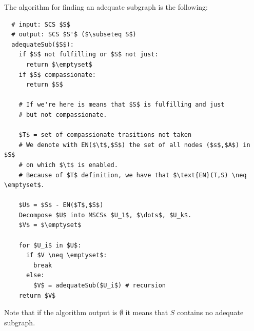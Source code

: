 \documentclass[oneside]{academica}
\begin{document}
The algorithm for finding an adequate subgraph is the following:
\begin{lstlisting}
  # input: SCS $S$
  # output: SCS $S'$ ($\subseteq S$)
  adequateSub($S$):
    if $S$ not fulfilling or $S$ not just:
      return $\emptyset$
    if $S$ compassionate:
      return $S$

    # If we're here is means that $S$ is fulfilling and just
    # but not compassionate.

    $T$ = set of compassionate trasitions not taken
    # We denote with EN($\t$,$S$) the set of all nodes ($s$,$A$) in $S$
    # on which $\t$ is enabled.
    # Because of $T$ definition, we have that $\text{EN}(T,S) \neq \emptyset$.

    $U$ = $S$ - EN($T$,$S$)
    Decompose $U$ into MSCSs $U_1$, $\dots$, $U_k$. 
    $V$ = $\emptyset$

    for $U_i$ in $U$:
      if $V \neq \emptyset$:
        break
      else:
        $V$ = adequateSub($U_i$) # recursion
    return $V$
\end{lstlisting}

\begin{note}
  Note that if the algorithm output is $\emptyset$ it means that $S$ contains no adequate subgraph.
\end{note}
\end{document}

